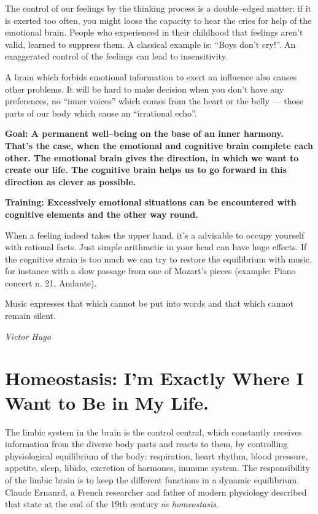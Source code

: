 \documentclass[../Book.Stress_regulation.tex]{subfiles}
\begin{document}
The control of our feelings by the thinking process is a double--edged matter: if it is exerted too often, you might loose the capacity to hear the cries for help of the emotional brain.
People who experienced in their childhood that feelings aren't valid, learned to suppress them.
A classical example is: ``Boys don't cry!''.
An exaggerated control of the feelings can lead to insensitivity.

A brain which forbids emotional information to exert an influence also causes other problems.
It will be hard to make decision when you don't have any preferences, no ``inner voices'' which comes from the heart or the belly --- those parts of our body which cause an ``irrational echo''.

\textbf{Goal: A permanent well--being on the base of an inner harmony.
  That's the case, when the emotional and cognitive brain complete each other.
  The emotional brain gives the direction, in which we want to create our life.
  The cognitive brain helps us to go forward in this direction as clever as possible.}

\textbf{Training: Excessively emotional situations can be encountered with cognitive elements and the other way round.}

When a feeling indeed takes the upper hand, it's a advisable to occupy yourself with rational facts.
Just simple arithmetic in your head can have huge effects.
If the cognitive strain is too much we can try to restore the equilibrium with music,
for instance with a slow passage from one of Mozart's pieces (example: Piano concert n. 21, Andante).


\epigraph{Music expresses that which cannot be put into words and that which cannot remain silent.}{\textit{Victor Hugo}}

\section[Homeostasis]{Homeostasis: I'm Exactly Where I Want to Be in My Life.}

The limbic system in the brain is the control central, which constantly receives information from the diverse body parts and reacts to them,
by controlling physiological equilibrium of the body:
respiration, heart rhythm, blood pressure, appetite, sleep, libido, excretion of hormones, immune system.
The responsibility of the limbic brain is to keep the different functions in a dynamic equilibrium.
Claude Ernanrd, a French researcher and father of modern physiology described that state at the end of the 19th century as \emph{homeostasis}.
\end{document}
